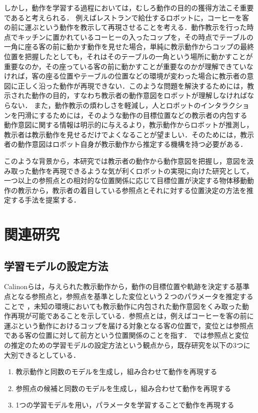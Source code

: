 しかし，動作を学習する過程においては，むしろ動作の目的の獲得方法こそ重要であると考えられる．
例えばレストランで給仕するロボットに，コーヒーを客の前に運ぶという動作を教示して再現させることを考える．動作教示を行った時点でキッチンに置かれているコーヒーの入ったコップを，その時点でテーブルの一角に座る客の前に動かす動作を見せた場合，単純に教示動作からコップの最終位置を把握したとしても，それはそのテーブルの一角という場所に動かすことが重要なのか，その座っている客の前に動かすことが重要なのかが理解できていなければ，客の座る位置やテーブルの位置などの環境が変わった場合に教示者の意図に正しく沿った動作が再現できない．このような問題を解決するためには，教示された動作の目的，すなわち教示者の動作意図をロボットが理解しなければならない．
また，動作教示の煩わしさを軽減し，人とロボットのインタラクションを円滑にするためには，そのような動作の目標位置などの教示者の内包する動作意図に関する情報は明示的に与えるより，教示動作からロボットが推測し，教示者は教示動作を見せるだけでよくなることが望ましい．そのためには，教示者の動作意図はロボット自身が教示動作から推定する機構を持つ必要がある．

このような背景から，本研究では教示者の動作から動作意図を把握し，意図を汲み取った動作を再現できるような気が利くロボットの実現に向けた研究として，一つ以上の参照点との相対的な位置関係に応じて目標位置が決定する物体移動動作の教示から，教示者の着目している参照点とそれに対する位置決定の方法を推定する手法を提案する．

\section{関連研究}

\subsection{学習モデルの設定方法}

Calinonら\cite{calinon}は，与えられた教示動作から，動作の目標位置や軌跡を決定する基準点となる参照点と，参照点を基準とした変位という２つのパラメータを推定することで
，未知の環境においても教示動作に内包された動作意図をくみ取った動作再現が可能であることを示している．参照点とは，例えばコーヒーを客の前に運ぶという動作におけるコップを届ける対象となる客の位置で，変位とは参照点である客の位置に対して前方という位置関係のことを指す．
\cite{calinon}では参照点と変位の推定のための学習モデルの設定方法という観点から，既存研究を以下の3つに大別できるとしている．

	\begin{enumerate}
		\item 教示動作と同数のモデルを生成し，組み合わせて動作を再現する
		\item 参照点の候補と同数のモデルを生成し，組み合わせて動作を再現する
		\item 1つの学習モデルを用い，パラメータを学習することで動作を再現する
	\end{enumerate}
	
